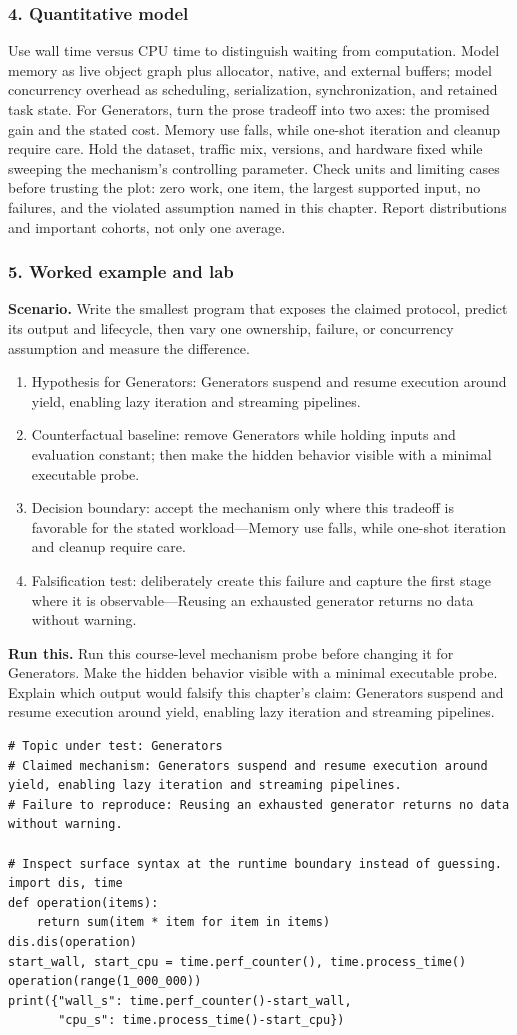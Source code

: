 \subsubsection*{4. Quantitative model}
Use wall time versus CPU time to distinguish waiting from computation. Model memory as live object graph plus allocator, native, and external buffers; model concurrency overhead as scheduling, serialization, synchronization, and retained task state.
For Generators, turn the prose tradeoff into two axes: the promised gain and the stated cost. Memory use falls, while one-shot iteration and cleanup require care. Hold the dataset, traffic mix, versions, and hardware fixed while sweeping the mechanism's controlling parameter.
Check units and limiting cases before trusting the plot: zero work, one item, the largest supported input, no failures, and the violated assumption named in this chapter. Report distributions and important cohorts, not only one average.
\subsubsection*{5. Worked example and lab}
\textbf{Scenario.} Write the smallest program that exposes the claimed protocol, predict its output and lifecycle, then vary one ownership, failure, or concurrency assumption and measure the difference.
\begin{enumerate}
\item Hypothesis for Generators: Generators suspend and resume execution around yield, enabling lazy iteration and streaming pipelines.
\item Counterfactual baseline: remove Generators while holding inputs and evaluation constant; then make the hidden behavior visible with a minimal executable probe.
\item Decision boundary: accept the mechanism only where this tradeoff is favorable for the stated workload—Memory use falls, while one-shot iteration and cleanup require care.
\item Falsification test: deliberately create this failure and capture the first stage where it is observable—Reusing an exhausted generator returns no data without warning.
\end{enumerate}
\textbf{Run this.} Run this course-level mechanism probe before changing it for Generators. Make the hidden behavior visible with a minimal executable probe. Explain which output would falsify this chapter's claim: Generators suspend and resume execution around yield, enabling lazy iteration and streaming pipelines.
\begin{Verbatim}[fontsize=\scriptsize]
# Topic under test: Generators
# Claimed mechanism: Generators suspend and resume execution around yield, enabling lazy iteration and streaming pipelines.
# Failure to reproduce: Reusing an exhausted generator returns no data without warning.

# Inspect surface syntax at the runtime boundary instead of guessing.
import dis, time
def operation(items):
    return sum(item * item for item in items)
dis.dis(operation)
start_wall, start_cpu = time.perf_counter(), time.process_time()
operation(range(1_000_000))
print({"wall_s": time.perf_counter()-start_wall,
       "cpu_s": time.process_time()-start_cpu})
\end{Verbatim}
